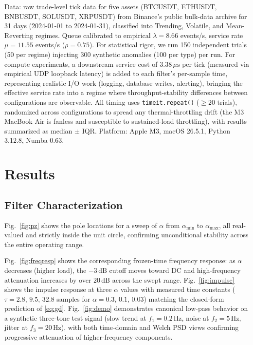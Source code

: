 \documentclass[conference]{IEEEtran}
\begin{document}
Data: raw trade-level tick data for five assets (BTCUSDT, ETHUSDT, BNBUSDT, SOLUSDT, XRPUSDT) from Binance's public bulk-data
archive \cite{binance} for 31 days (2024-01-01 to 2024-01-31), classified into Trending, Volatile, and Mean-Reverting regimes. Queue calibrated to empirical
$\lambda=8.66$ events/s, service rate $\mu=11.55$ events/s ($\rho=0.75$).
For statistical rigor, we run 150 independent trials (50 per regime) injecting 300 synthetic anomalies (100 per type) per run. For
compute experiments, a downstream service cost of $3.38\,\mu\text{s}$ per tick
(measured via empirical UDP loopback latency)
is added to each filter's per-sample time, representing realistic I/O work
(logging, database writes, alerting), bringing the effective service rate into
a regime where throughput-stability differences between configurations are
observable. All timing uses \texttt{timeit.repeat()} ($\ge20$ trials),
randomized across configurations to spread any thermal-throttling drift (the
M3 MacBook Air is fanless and susceptible to sustained-load throttling), with
results summarized as median $\pm$ IQR. Platform: Apple M3, macOS 26.5.1,
Python 3.12.8, Numba 0.63.

\section{Results}

\subsection{Filter Characterization}
Fig.~\ref{fig:pz} shows the pole locations for a sweep of $\alpha$ from
$\alpha_\text{min}$ to $\alpha_\text{max}$, all real-valued and strictly
inside the unit circle, confirming unconditional stability across the entire
operating range.

Fig.~\ref{fig:freqresp} shows the corresponding frozen-time frequency
response: as $\alpha$ decreases (higher load), the $-3\,\text{dB}$ cutoff
moves toward DC and high-frequency attenuation increases by over $20\,\text{dB}$
across the swept range. Fig.~\ref{fig:impulse} shows the impulse response at
three $\alpha$ values with measured time constants ($\tau=2.8$, $9.5$, $32.8$
samples for $\alpha=0.3$, $0.1$, $0.03$) matching the closed-form
prediction of \eqref{eq:gd}. Fig.~\ref{fig:demo} demonstrates canonical
low-pass behavior on a synthetic three-tone test signal (slow trend at
$f_1=0.2$\,Hz, noise at $f_2=5$\,Hz, jitter at $f_3=20$\,Hz), with both
time-domain and Welch PSD views confirming progressive attenuation of
higher-frequency components.
\end{document}
